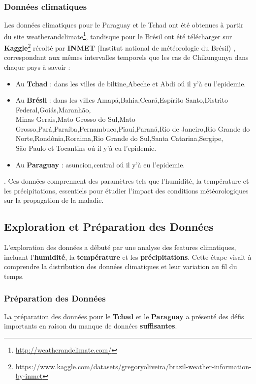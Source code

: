 \subsubsection{Données climatiques}
Les données climatiques pour le Paraguay et le Tchad ont été obtenues à partir du site weatherandclimate\footnote{\url{http://weatherandclimate.com/}}, tandisque pour le Brésil ont été télécharger sur \textbf{Kaggle}\footnote{\url{https://www.kaggle.com/datasets/gregoryoliveira/brazil-weather-information-by-inmet}} récolté par \textbf{INMET} (Institut
national de météorologie du Brésil) , correspondant aux mêmes intervalles temporels que les cas de Chikungunya dans chaque pays à savoir : 
\begin{itemize}
	\item Au \textbf{Tchad} : dans les villes de biltine,Abeche et Abdi oú il y'à eu l'epidemie.
	\item Au \textbf{Brésil} : dans les villes Amapá,Bahia,Ceará,Espírito Santo,Distrito Federal,Goiás,Maranhão,\\Minas Gerais,Mato Grosso do Sul,Mato Grosso,Pará,Paraíba,Pernambuco,Piauí,Paraná,Rio de Janeiro,Rio Grande do Norte,Rondônia,Roraima,Rio Grande do Sul,Santa Catarina,Sergipe,\\São Paulo et Tocantins oú il y'à eu l'epidemie.
	\item Au \textbf{Paraguay} : asuncion,central oú il y'à eu l'epidemie.
\end{itemize}.
Ces données comprennent des paramètres tels que l'humidité, la température et les précipitations, essentiels pour étudier l'impact des conditions météorologiques sur la propagation de la maladie.

\subsection{Exploration et Préparation des Données}
L'exploration des données a débuté par une analyse des features climatiques, incluant l'\textbf{humidité}, la \textbf{température} et les \textbf{précipitations}. Cette étape visait à comprendre la distribution des données climatiques et leur variation au fil du temps.
\subsubsection{Préparation des Données}
La préparation des données pour le \textbf{Tchad} et le \textbf{Paraguay} a présenté des défis importants en raison du manque de données \textbf{suffisantes}.

